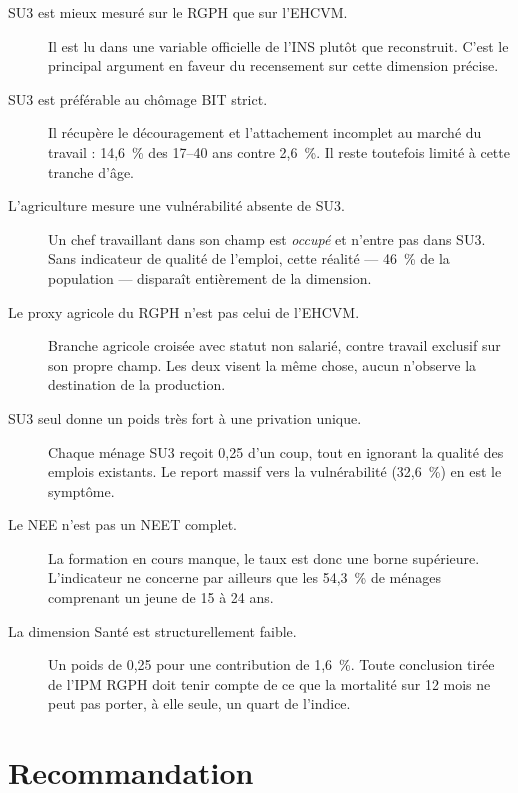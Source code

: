 \documentclass[11pt,a4paper]{article}
\begin{document}
\begin{description}
  \item[SU3 est mieux mesuré sur le RGPH que sur l'EHCVM.] Il est lu dans une variable
  officielle de l'INS plutôt que reconstruit. C'est le principal argument en faveur du
  recensement sur cette dimension précise.

  \item[SU3 est préférable au chômage BIT strict.] Il récupère le découragement et
  l'attachement incomplet au marché du travail : 14,6~\% des 17--40 ans contre 2,6~\%. Il reste
  toutefois limité à cette tranche d'âge.

  \item[L'agriculture mesure une vulnérabilité absente de SU3.] Un chef travaillant dans son
  champ est \emph{occupé} et n'entre pas dans SU3. Sans indicateur de qualité de l'emploi, cette
  réalité --- 46~\% de la population --- disparaît entièrement de la dimension.

  \item[Le proxy agricole du RGPH n'est pas celui de l'EHCVM.] Branche agricole croisée avec
  statut non salarié, contre travail exclusif sur son propre champ. Les deux visent la même
  chose, aucun n'observe la destination de la production.

  \item[SU3 seul donne un poids très fort à une privation unique.] Chaque ménage SU3 reçoit 0,25
  d'un coup, tout en ignorant la qualité des emplois existants. Le report massif vers la
  vulnérabilité (32,6~\%) en est le symptôme.

  \item[Le NEE n'est pas un NEET complet.] La formation en cours manque, le taux est donc une
  borne supérieure. L'indicateur ne concerne par ailleurs que les 54,3~\% de ménages comprenant
  un jeune de 15 à 24 ans.

  \item[La dimension Santé est structurellement faible.] Un poids de 0,25 pour une contribution
  de 1,6~\%. Toute conclusion tirée de l'IPM RGPH doit tenir compte de ce que la mortalité sur
  12 mois ne peut pas porter, à elle seule, un quart de l'indice.
\end{description}

\section{Recommandation}
\end{document}
